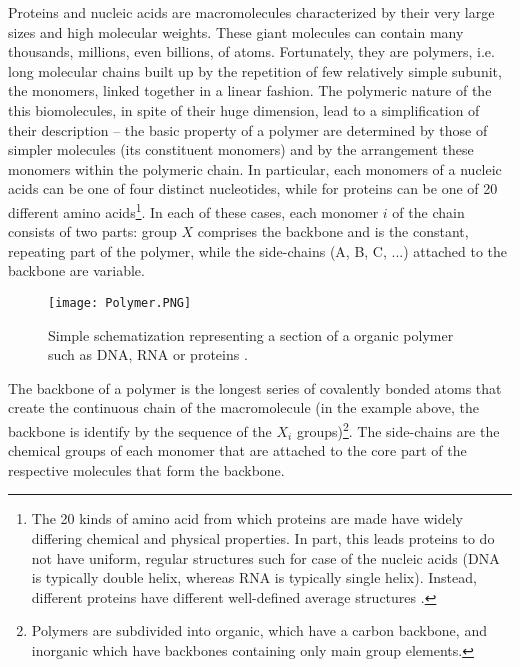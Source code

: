Proteins and nucleic acids are macromolecules characterized by their very large sizes and high molecular weights. These giant molecules can contain many thousands, millions, even billions, of atoms. Fortunately, they are polymers, i.e. long molecular chains built up by the repetition of few relatively simple subunit, the monomers, linked together in a linear fashion. The polymeric nature of the this biomolecules, in spite of their huge dimension, lead to a simplification of their description -- the basic property of a polymer are determined by those of simpler molecules (its constituent monomers) and by the arrangement these monomers within the polymeric chain. In particular, each monomers of a nucleic acids can be one of four distinct nucleotides, while for proteins can be one of 20 different amino acids\footnote{The 20 kinds of amino acid from which proteins are made have widely differing chemical and physical properties. In part, this leads proteins to do not have uniform, regular structures such for case of the nucleic acids (DNA is typically double helix, whereas RNA is typically single helix). Instead, different proteins have different well-defined average structures \cite{voet2016fundamentals}.}. In each of these cases, each monomer $i$ of the chain consists of two parts: group $X$ comprises the backbone and is the constant, repeating part of the polymer, while the side-chains (A, B, C, ...) attached to the backbone are variable.

\begin{figure}[h]
\centering
\begin{minipage}[t]{0.8\textwidth}
\centering
\texttt{[image: Polymer.PNG]}

\caption{\small{Simple schematization representing a section of a organic polymer such as DNA, RNA or proteins \cite{creighton2010biophysical}.}}

\label{fig:Polymer}
\end{minipage} 
\end{figure}

The backbone of a polymer is the longest series of covalently bonded atoms that create the continuous chain of the macromolecule (in the example above, the backbone is identify by the sequence of the $X_i$ groups)\footnote{Polymers are subdivided into organic, which have a carbon backbone, and inorganic which have backbones containing only main group elements.}. The side-chains are the chemical groups of each monomer that are attached to the core part of the respective molecules that form the backbone.

